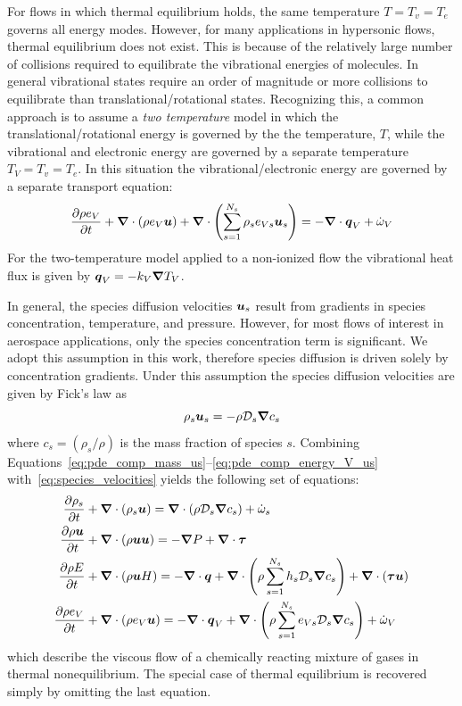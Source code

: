 For flows in which thermal equilibrium holds, the same temperature $T=T_v=T_e$ governs all energy modes.  However, for many applications in hypersonic flows, thermal equilibrium does not exist.  This is because of the relatively large number of collisions required to equilibrate the vibrational energies of molecules.  In general vibrational states require an order of magnitude or more collisions to equilibrate than translational/rotational states.  Recognizing this, a common approach is to assume a \emph{two temperature} model in which the translational/rotational energy is governed by the the temperature, $T$, while the vibrational and electronic energy are governed by a separate temperature $T_V=T_v=T_e$.  In this situation the vibrational/electronic energy are governed by a separate transport equation:
\begin{equation}
  \label{eq:pde_comp_energy_V_us}
  {\frac{\partial{\rho e_V}}{\partial{t}}} + {\boldsymbol{\nabla}} {}\cdot\left(\rho e_V {\boldsymbol{u}}\right) + {\boldsymbol{\nabla}} {}\cdot\left(\sum_{s=1}^{N_s}\rho_s e_{Vs} {\boldsymbol{u}}_s\right) =
    -{\boldsymbol{\nabla}} {}\cdot{\boldsymbol{q}}_V + \dot{\omega}_V
\end{equation}
For the two-temperature model applied to a non-ionized flow the vibrational heat flux is given by ${\boldsymbol{q}}_V = - k_V{\boldsymbol{\nabla}} {T_V}$.

In general, the species diffusion velocities ${\boldsymbol{u}}_s$ result from gradients in species concentration, temperature, and pressure.  However, for most flows of interest in aerospace applications, only the species concentration term is significant.  We adopt this assumption in this work, therefore species diffusion is driven solely by concentration gradients.  Under this assumption the species diffusion velocities are given by Fick's law as
\begin{equation}
  \label{eq:species_velocities}
  \rho_s {\boldsymbol{u}}_s = -\rho \mathcal{D}_s {\boldsymbol{\nabla}} {c_s}
\end{equation}
where $c_s=\left(\rho_s/\rho\right)$ is the mass fraction of species $s$.  Combining Equations~\eqref{eq:pde_comp_mass_us}--\eqref{eq:pde_comp_energy_V_us} with~\eqref{eq:species_velocities} yields the following set of equations:
\begin{align}
  \label{eq:pde_comp_mass}
  {\frac{\partial{\rho_s}}{\partial{t}}} &+ {\boldsymbol{\nabla}} {}\cdot \left(\rho_s{\boldsymbol{u}}\right) = {\boldsymbol{\nabla}} {}\cdot\left(\rho \mathcal{D}_s {\boldsymbol{\nabla}} {c_s}\right) + \dot{\omega}_s \\
  \label{eq:pde_comp_mom}
  {\frac{\partial{\rho{\boldsymbol{u}}}}{\partial{t}}} &+ {\boldsymbol{\nabla}} {}\cdot\left(\rho{\boldsymbol{u}}{\boldsymbol{u}}\right) =
    -{\boldsymbol{\nabla}} {P} + {\boldsymbol{\nabla}} {}\cdot{\boldsymbol{\tau}} \\
  \label{eq:pde_comp_energy}
  {\frac{\partial{\rho E}}{\partial{t}}} &+ {\boldsymbol{\nabla}} {}\cdot\left(\rho {\boldsymbol{u}} H\right) =
    -{\boldsymbol{\nabla}} {}\cdot{\boldsymbol{q}} + {\boldsymbol{\nabla}} {}\cdot\left(\rho \sum_{s=1}^{N_s} h_s \mathcal{D}_s {\boldsymbol{\nabla}} {c_s}\right)  + {\boldsymbol{\nabla}} {}\cdot\left({\boldsymbol{\tau}}{\boldsymbol{u}}\right)   \\
  \label{eq:pde_comp_energy_V}
  {\frac{\partial{\rho e_V}}{\partial{t}}} &+ {\boldsymbol{\nabla}} {}\cdot\left(\rho e_V {\boldsymbol{u}}\right) =
    -{\boldsymbol{\nabla}} {}\cdot{\boldsymbol{q}}_V + {\boldsymbol{\nabla}} {}\cdot\left(\rho \sum_{s=1}^{N_s} e_{Vs} \mathcal{D}_s {\boldsymbol{\nabla}} {c_s}\right)  + \dot{\omega}_V
\end{align}
which describe the viscous flow of a chemically reacting mixture of gases in thermal nonequilibrium.  The special case of thermal equilibrium is recovered simply by omitting the last equation.

